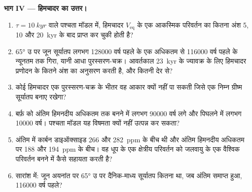 \begin{problem}
\medskip\noindent\textbf{भाग IV --- हिमचादर का उत्तर।}
\begin{enumerate}[resume]
  \item $\tau = \qty{10}{kyr}$ वाले पश्चता मॉडल में, हिमचादर
        $V_{\mathrm{eq}}$ के एक आकस्मिक परिवर्तन का कितना अंश 5, 10 और \qty{20}{kyr} के बाद प्राप्त कर चुकी होती है?
  \item \ang{65} उ पर जून सूर्यातप लगभग \num{128000} वर्ष पहले के एक अधिकतम से
        \num{116000} वर्ष पहले के न्यूनतम तक गिरा, यानी आधा पुरस्सरण-चक्र। आवर्तकाल
        \qty{23}{kyr} के ज्यावक्र के लिए हिमचादर प्रणोदन के कितने अंश का अनुसरण करती है, और कितनी देर से?
  \item कोई हिमचादर एक पुरस्सरण-चक्र के भीतर वह आकार क्यों नहीं पा सकती जिसे एक निम्न ग्रीष्म
        सूर्यातप बनाए रखेगा?
  \item बर्फ़ को अंतिम हिमनदीय अधिकतम तक बनने में लगभग \num{90000} वर्ष लगे और पिघलने में लगभग
        \num{10000} वर्ष। पश्चता मॉडल यह विषमता क्यों नहीं उत्पन्न कर सकता?
  \item अंतिम  में कार्बन डाइऑक्साइड 266 और \qty{282}{ppm} के बीच थी और अंतिम हिमनदीय अधिकतम पर
        188 और \qty{194}{ppm} के बीच। वह धूप के एक क्षेत्रीय परिवर्तन को जलवायु के एक वैश्विक परिवर्तन
        बनने में कैसे सहायता करती है?
  \item सारांश में: जून अयनांत पर \ang{65} उ पर दैनिक-माध्य सूर्यातप कितना था, जब
        अंतिम  समाप्त हुआ, \num{116000} वर्ष पहले?
\end{enumerate}
\end{problem}
